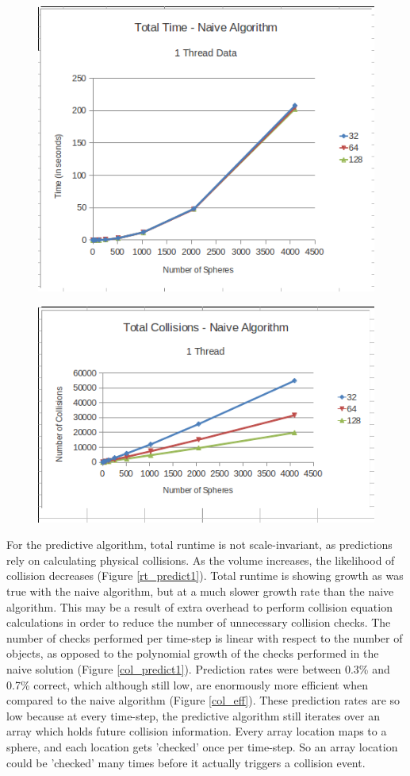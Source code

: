 \documentclass[CEJCS,PDF]{cej} %
\begin{document}
\begin{center}
\begin{figure}
	\includegraphics[width=.45\textwidth]{runtime_naive_1thread.png}
	\label{rt_naive1}
\end{figure}
\end{center}

\begin{center}
\begin{figure}
	\includegraphics[width=.45\textwidth]{collisions_naive_1thread.png}
	\label{col_naive1}
\end{figure}
\end{center}

For the predictive algorithm, total runtime is not scale-invariant, as predictions rely on calculating physical collisions.  As the volume increases, the likelihood of collision decreases (Figure \ref{rt_predict1}).  Total runtime is showing growth as was true with the naive algorithm, but at a much slower growth rate than the naive algorithm.  This may be a result of extra overhead to perform collision equation calculations in order to reduce the number of unnecessary collision checks.  The number of checks performed per time-step is linear with respect to the number of objects, as opposed to the polynomial growth of the checks performed in the naive solution (Figure \ref{col_predict1}).  Prediction rates were between 0.3\% and 0.7\% correct, which although still low, are enormously more efficient when compared to the naive algorithm (Figure \ref{col_eff}).  These prediction rates are so low because at every time-step, the predictive algorithm still iterates over an array which holds future collision information.  Every array location maps to a sphere, and each location gets 'checked' once per time-step.  So an array location could be 'checked' many times before it actually triggers a collision event.
\end{document}
